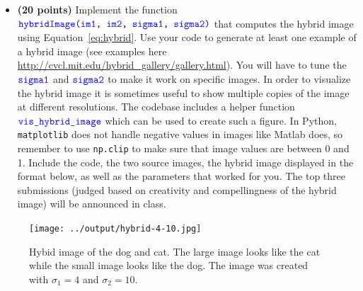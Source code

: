 \documentclass[10pt,letterpaper]{article}
\newcommand{\cmd}[1] {{\color{blue}\texttt{#1}}}
\begin{document}
\begin{itemize}

\item \textbf{(20 points)} Implement the function 
$\cmd{hybridImage(im1, im2, sigma1, sigma2)}$ that computes the hybrid image using Equation~\ref{eq:hybrid}. Use your code to generate at least one example of a hybrid image (see examples here \url{http://cvcl.mit.edu/hybrid_gallery/gallery.html}). You will have to tune the $\cmd{sigma1}$ and $\cmd{sigma2}$ to make it work on specific images. In order to visualize the hybrid image it is sometimes useful to show multiple copies of the image at different resolutions. The codebase includes a helper function $\cmd{vis\_hybrid\_image}$ which can be used to create such a figure.
In Python, \cmd{matplotlib} does not handle negative values in images like Matlab does, so remember to use \cmd{np.clip} to make sure that image values are between 0 and 1.
Include the code, the two source images, the hybrid image displayed in the format below, as well as the parameters that worked for you. The top three submissions (judged based on creativity and compellingness of the hybrid image) will be announced in class.

\end{itemize}
\begin{figure}[h]
\texttt{[image: ../output/hybrid-4-10.jpg]}
\caption{Hybid image of the dog and cat. The large image looks like the cat while the small image looks like the dog. The image was created with $\sigma_1 = 4$ and $\sigma_2 = 10$.}
\end{figure}
\end{document}
